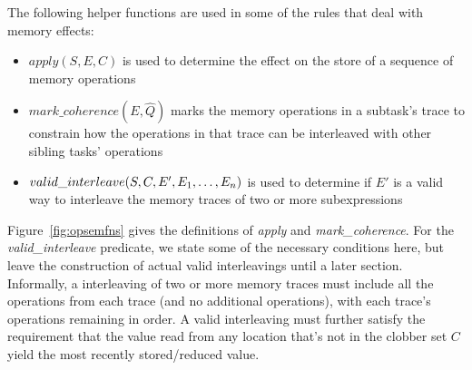 \begin{itemize}
The following helper functions are used in some of the rules that deal with memory effects:
\begin{itemize}
\item $apply(S, E, C)$ is used to determine the effect on the store of a sequence of memory operations
\item $mark\_coherence(E, \hat Q)$ marks the memory operations in a subtask's trace to
constrain how the operations in that trace can be interleaved with other sibling tasks' operations
\item $valid\_interleave(S, C, E', {E}_1,\ldots,{E}_n)$ is used to determine if $E'$ is a valid way to
interleave the memory traces of two or more subexpressions
\end{itemize}
Figure~\ref{fig:opsemfns} gives the definitions of {\em apply} and {\em mark\_coherence}.  For
the {\em valid\_interleave} predicate, we state some of the necessary conditions here, but leave 
the construction of actual valid interleavings until a later section.  Informally, a interleaving
of two or more memory traces must include all the operations from each trace (and no additional
operations), with each trace's operations remaining in order.  A valid interleaving must further
satisfy the requirement that the value read from any location that's not in the clobber set $C$
yield the most recently stored/reduced value.


\end{itemize}
